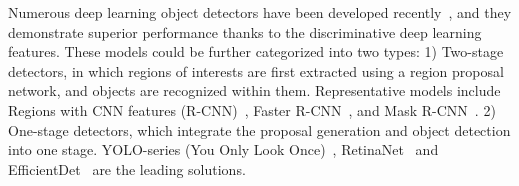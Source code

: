 \documentclass[letterpaper]{article} %
\def \eg {\emph{e.g.}}
\newcommand\rjf[1]{\textcolor{red}{\{RJF: #1\}}}
\begin{document}
\begin{figure}[!tb]
{ %
 }
	\label{fig: structure}
\end{figure}

Numerous deep learning object detectors have been developed recently~\cite{Ren_2017_Faster, Ge_2021_YOLOX}, %
and they demonstrate superior performance thanks to the discriminative deep learning features.
These models could be further categorized into two types: 1) Two-stage detectors, in which regions of interests are first extracted using a region proposal network, and objects are recognized within them. %
Representative models include %
Regions with CNN features (R-CNN)~\cite{Girshick_2014_Rich}, Faster R-CNN~\cite{Ren_2017_Faster}, and Mask R-CNN~\cite{He_2017_Mask}. 2) One-stage detectors, which integrate the proposal generation and object detection into one stage. YOLO-series (You Only Look Once)~\cite{Redmon_2016_You, Redmon_2017_YOLO9000, Ge_2021_YOLOX}, %
RetinaNet~\cite{Lin_2020_Focal} and EfficientDet~\cite{Tan_2020_EfficientDet} are the leading solutions.
\end{document}
